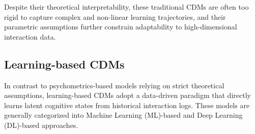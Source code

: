 \documentclass[runningheads]{llncs}
\begin{document}
Despite their theoretical interpretability, these traditional CDMs are often too rigid to capture complex and non-linear learning trajectories, and their parametric assumptions further constrain adaptability to high-dimensional interaction data.  



\subsection{Learning-based CDMs}
In contrast to psychometrics-based models relying on strict theoretical assumptions, learning-based CDMs adopt a data-driven paradigm that directly learns latent cognitive states from historical interaction logs. These models are generally categorized into Machine Learning (ML)-based and Deep Learning (DL)-based approaches.
\end{document}
